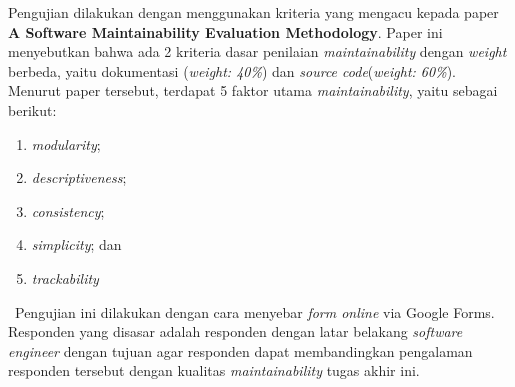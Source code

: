 Pengujian dilakukan dengan menggunakan kriteria yang mengacu kepada paper \textbf{A Software Maintainability Evaluation Methodology}\cite{peercy_software_nodate}. Paper ini menyebutkan bahwa ada 2 kriteria dasar penilaian \textit{maintainability} dengan \textit{weight} berbeda, yaitu dokumentasi (\textit{weight: 40\%}) dan \textit{source code}(\textit{weight: 60\%}). Menurut paper tersebut, terdapat 5 faktor utama \textit{maintainability}, yaitu sebagai berikut:
\begin{enumerate}
	\item \textit{modularity};
	\item \textit{descriptiveness};
	\item \textit{consistency};
	\item \textit{simplicity}; dan
	\item \textit{trackability}
\end{enumerate}

\ \indent Pengujian ini dilakukan dengan cara menyebar \textit{form online} via Google Forms. Responden yang disasar adalah responden dengan latar belakang \textit{software engineer} dengan tujuan agar responden dapat membandingkan pengalaman responden tersebut dengan kualitas \textit{maintainability} tugas akhir ini.
